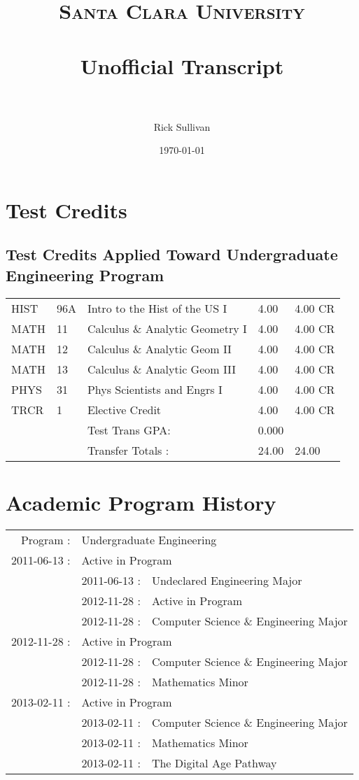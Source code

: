 \documentclass[paper=letter, fontsize=11pt]{scrartcl} %
\title{ 
\normalfont \normalsize 
\textsc{Santa Clara University} \\ [25pt] %
\horrule{0.5pt} \\[0.4cm] %
\huge Unofficial Transcript\\ %
\horrule{2pt} \\[0.5cm] %
}
\author{Rick Sullivan} %
\date{\normalsize\today} %
\begin{document}
\maketitle %


\section{Test Credits}
\subsection{Test Credits Applied Toward Undergraduate Engineering Program}
\begin{tabular}{ l l l l l }
    HIST & 96A & Intro to the Hist of the US I & 4.00 & 4.00 CR \\
    MATH & 11  & Calculus \& Analytic Geometry I & 4.00 & 4.00 CR \\
    MATH & 12 & Calculus \& Analytic Geom II & 4.00 & 4.00 CR \\
    MATH & 13 & Calculus \& Analytic Geom III & 4.00 & 4.00 CR \\
    PHYS & 31 & Phys Scientists and Engrs I & 4.00 & 4.00 CR\\
    TRCR & 1 & Elective Credit & 4.00 & 4.00 CR \\
    \hline
    & & Test Trans GPA: & 0.000  & \\
    & & Transfer Totals : & 24.00 & 24.00%
\end{tabular}


\section{Academic Program History}

\begin{tabular}{r l l}
Program : & \multicolumn{2}{l}{Undergraduate Engineering} \\
2011-06-13 : & \multicolumn{2}{l}{Active in Program} \\
    & 2011-06-13 : & Undeclared Engineering Major\\
    & 2012-11-28 : & Active in Program\\
    & 2012-11-28 : & Computer Science \& Engineering Major\\
2012-11-28 : & \multicolumn{2}{l}{Active in Program}\\
    & 2012-11-28 : & Computer Science \& Engineering Major\\
    & 2012-11-28 : & Mathematics Minor\\
2013-02-11 : & \multicolumn{2}{l}{Active in Program}\\
    & 2013-02-11 : & Computer Science \& Engineering Major\\
    & 2013-02-11 : & Mathematics Minor\\
    & 2013-02-11 : & The Digital Age Pathway\\
\end{tabular}
\end{document}
